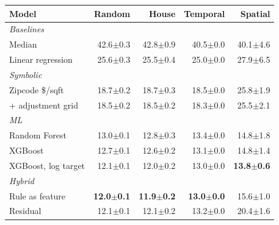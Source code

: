 \setlength{\tabcolsep}{3pt}
\begin{tabular}{lrrrr}
\hline
Model & Random & House & Temporal & Spatial \\
\hline
\multicolumn{5}{l}{\textit{Baselines}} \\
\quad Median & 42.6$\pm$0.3 & 42.8$\pm$0.9 & 40.5$\pm$0.0 & 40.1$\pm$4.6 \\
\quad Linear regression & 25.6$\pm$0.3 & 25.5$\pm$0.4 & 25.0$\pm$0.0 & 27.9$\pm$6.5 \\
\hline
\multicolumn{5}{l}{\textit{Symbolic}} \\
\quad Zipcode \$/sqft & 18.7$\pm$0.2 & 18.7$\pm$0.3 & 18.5$\pm$0.0 & 25.8$\pm$1.9 \\
\quad + adjustment grid & 18.5$\pm$0.2 & 18.5$\pm$0.2 & 18.3$\pm$0.0 & 25.5$\pm$2.1 \\
\hline
\multicolumn{5}{l}{\textit{ML}} \\
\quad Random Forest & 13.0$\pm$0.1 & 12.8$\pm$0.3 & 13.4$\pm$0.0 & 14.8$\pm$1.8 \\
\quad XGBoost & 12.7$\pm$0.1 & 12.6$\pm$0.2 & 13.1$\pm$0.0 & 14.8$\pm$1.4 \\
\quad XGBoost, log target & 12.1$\pm$0.1 & 12.0$\pm$0.2 & 13.0$\pm$0.0 & \textbf{13.8$\pm$0.6} \\
\hline
\multicolumn{5}{l}{\textit{Hybrid}} \\
\quad Rule as feature & \textbf{12.0$\pm$0.1} & \textbf{11.9$\pm$0.2} & \textbf{13.0$\pm$0.0} & 15.6$\pm$1.0 \\
\quad Residual & 12.1$\pm$0.1 & 12.1$\pm$0.2 & 13.2$\pm$0.0 & 20.4$\pm$1.6 \\
\hline
\end{tabular}

